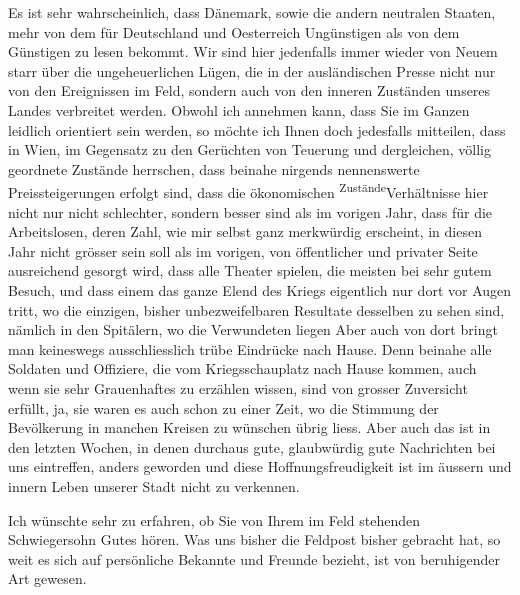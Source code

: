 \pstart
           Es ist sehr wahrscheinlich, dass {\pb}Dänemark, sowie die andern neutralen Staaten,
               mehr von dem für Deutschland und Oesterreich Ungünstigen als von dem Günstigen zu
               lesen bekommt. Wir sind hier jedenfalls immer wieder von Neuem starr über die
               ungeheuerlichen Lügen, die in der ausländischen Presse nicht nur von den Ereignissen
               im Feld, sondern auch von den inneren Zuständen unseres Landes verbreitet werden.
               Obwohl ich annehmen kann, dass Sie im Ganzen \label{LL710-1v}\label{LL710-1h}leidlich orientiert sein werden, so möchte ich Ihnen doch jedesfalls mitteilen,
               dass in Wien, im Gegensatz zu den Gerüchten von
               Teuerung und dergleichen, völlig geordnete Zustände herrschen, dass beinahe nirgends
               nennenswerte Preissteigerungen erfolgt sind, dass die ökonomischen \substVorne{}\textsuperscript{Zustände}\substDazwischen{}Verhältnisse\substHinten{} hier nicht nur nicht schlechter, sondern besser sind als im vorigen Jahr,
               dass für die Arbeitslosen, deren Zahl, wie mir selbst ganz merkwürdig erscheint, in
               diesen Jahr nicht grösser sein soll als im vorigen, von öffentlicher und privater
               Seite ausreichend {\pb}gesorgt wird, dass alle Theater
               spielen, die meisten bei sehr gutem Besuch, und dass einem das ganze Elend des Kriegs
               eigentlich nur dort vor Augen tritt, wo die einzigen, bisher unbezweifelbaren
               Resultate desselben zu sehen sind, nämlich in den Spitälern, wo die Verwundeten
                  liegen{\dotstwo} Aber auch von dort bringt man keineswegs
               ausschliesslich trübe Eindrücke nach Hause. Denn beinahe alle Soldaten und Offiziere,
               die vom Kriegsschauplatz nach Hause kommen, auch wenn sie sehr Grauenhaftes zu
               erzählen wissen, sind von grosser Zuversicht erfüllt, ja, sie waren es auch schon zu
               einer Zeit, wo die Stimmung der Bevölkerung in manchen Kreisen zu wünschen übrig
               liess. Aber auch das ist in den letzten Wochen, in denen durchaus gute, glaubwürdig
               gute Nachrichten bei uns eintreffen, anders geworden und diese Hoffnungsfreudigkeit
               ist im äussern und innern Leben unserer Stadt nicht zu verkennen.\pend
           
\pstart
           Ich wünschte sehr zu erfahren, ob {\pb}Sie von Ihrem
               im Feld stehenden Schwiegersohn Gutes hören. Was uns bisher die Feldpost bisher
               gebracht hat, so weit es sich auf persönliche Bekannte und Freunde bezieht, ist von
               beruhigender Art gewesen.\pend
           
